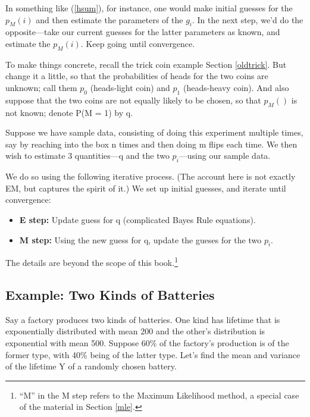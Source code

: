\documentclass[11pt]{article}
\begin{document}
In something like (\ref{hsum}), for instance, one would make initial
guesses for the $p_M(i)$ and then estimate the parameters of the $g_i$.
In the next step, we'd do the opposite---take our current guesses for
the latter parameters as known, and estimate the $p_M(i)$.  Keep going
until convergence.

To make things concrete, recall the trick coin example Section
\ref{oldtrick}.  But change it a little, so that the probabilities of
heads for the two coins are unknown; call them $p_0$ (heads-light coin)
and $p_1$ (heads-heavy coin).  And also suppose that the two coins are
not equally likely to be chosen, so that $p_M()$ is not known; denote
P(M = 1) by q.

Suppose we have sample data, consisting of doing this experiment
multiple times, say by reaching into the box n times and then doing m
flips each time.  We then wish to estimate 3 quantities---q and the two
$p_i$---using our sample data.  

We do so using the following iterative process.  (The account here is
not exactly EM, but captures the spirit of it.) We set up initial
guesses, and iterate until convergence:

\begin{itemize}

\item {\bf E step:} Update guess for q (complicated Bayes Rule equations).

\item {\bf M step:} Using the new guess for q, update the gueses for the
two $p_i$.

\end{itemize}

The details are beyond the scope of this book.\footnote{``M'' in the M
step refers to the Maximum Likelihood method, a special case of the
material in Section \ref{mle}.}

\subsection{Example:  Two Kinds of Batteries}

Say a factory produces two kinds of batteries.  One kind has lifetime
that is exponentially distributed with mean 200 and the other's
distribution is exponential with mean 500.  Suppose 60\% of the
factory's production is of the former type, with 40\% being of the
latter type.  Let's find the mean and variance of the lifetime Y of a
randomly chosen battery.
\end{document}
